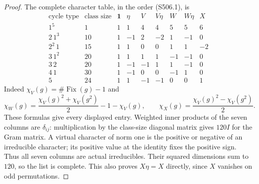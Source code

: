 \begin{proof}
The complete character table, in the order (S506.1), is
\[
\begin{array}{c|r|rrrrrrr}
\text{cycle type}&\text{class size}&\mathbf1&\eta&V&V\eta&W&W\eta&X\\\hline
1^5&1&1&1&4&4&5&5&6\\
2\,1^3&10&1&-1&2&-2&1&-1&0\\
2^2\,1&15&1&1&0&0&1&1&-2\\
3\,1^2&20&1&1&1&1&-1&-1&0\\
3\,2&20&1&-1&-1&1&1&-1&0\\
4\,1&30&1&-1&0&0&-1&1&0\\
5&24&1&1&-1&-1&0&0&1
\end{array}
 \tag{S506.5}
\]
Indeed $\chi_V(g)=\#\operatorname{Fix}(g)-1$ and
\[
 \chi_W(g)=\frac{\chi_V(g)^2+\chi_V(g^2)}2-1-\chi_V(g),\qquad
 \chi_X(g)=\frac{\chi_V(g)^2-\chi_V(g^2)}2.
\]
These formulas give every displayed entry.  Weighted inner products
of the seven columns are $\delta_{ij}$: multiplication by the
class-size diagonal matrix gives $120I$ for the Gram matrix.
A virtual character of norm one is the positive or negative of
an irreducible character; its positive value at the identity fixes
the positive sign.  Thus all seven columns are actual irreducibles.
Their squared dimensions sum to $120$, so the list is complete.
This also proves $X\eta=X$ directly, since $X$ vanishes on odd
permutations.


\end{proof}
